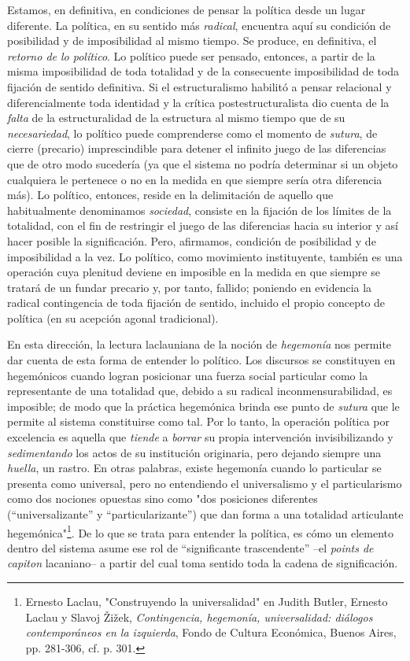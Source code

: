 \documentclass{book}
\begin{document}
Estamos, en definitiva, en condiciones de pensar la política desde un
lugar diferente. La política, en su sentido más \emph{radical},
encuentra aquí su condición de posibilidad y de imposibilidad al mismo
tiempo. Se produce, en definitiva, el \emph{retorno de lo político}. Lo
político puede ser pensado, entonces, a partir de la misma imposibilidad
de toda totalidad y de la consecuente imposibilidad de toda fijación de
sentido definitiva. Si el estructuralismo habilitó a pensar relacional y
diferencialmente toda identidad y la crítica postestructuralista dio
cuenta de la \emph{falta} de la estructuralidad de la estructura al
mismo tiempo que de su \emph{necesariedad}, lo político puede
comprenderse como el momento de \emph{sutura}, de cierre (precario)
imprescindible para detener el infinito juego de las diferencias que de
otro modo sucedería (ya que el sistema no podría determinar si un objeto
cualquiera le pertenece o no en la medida en que siempre sería otra
diferencia más). Lo político, entonces, reside en la delimitación de
aquello que habitualmente denominamos \emph{sociedad}, consiste en la
fijación de los límites de la totalidad, con el fin de restringir el
juego de las diferencias hacia su interior y así hacer posible la
significación. Pero, afirmamos, condición de posibilidad y de
imposibilidad a la vez. Lo político, como movimiento instituyente,
también es una operación cuya plenitud deviene en imposible en la medida
en que siempre se tratará de un fundar precario y, por tanto, fallido;
poniendo en evidencia la radical contingencia de toda fijación de
sentido, incluido el propio concepto de política (en su acepción agonal
tradicional).

En esta dirección, la lectura laclauniana de la noción de
\emph{hegemonía} nos permite dar cuenta de esta forma de entender lo
político. Los discursos se constituyen en hegemónicos cuando logran
posicionar una fuerza social particular como la representante de una
totalidad que, debido a su radical inconmensurabilidad, es imposible; de
modo que la práctica hegemónica brinda ese punto de \emph{sutura} que le
permite al sistema constituirse como tal. Por lo tanto, la operación
política por excelencia es aquella que \emph{tiende} a \emph{borrar} su
propia intervención invisibilizando y \emph{sedimentando} los actos de
su institución originaria, pero dejando siempre una \emph{huella}, un
rastro. En otras palabras, existe hegemonía cuando lo particular se
presenta como universal, pero no entendiendo el universalismo y el
particularismo como dos nociones opuestas sino como "dos posiciones
diferentes (``universalizante'' y ``particularizante'') que dan forma a
una totalidad articulante hegemónica"\footnote{Ernesto Laclau,
  "Construyendo la universalidad" en Judith Butler, Ernesto Laclau y
  Slavoj Žižek, \emph{Contingencia, hegemonía, universalidad: diálogos
  contemporáneos en la izquierda}, Fondo de Cultura Económica, Buenos
  Aires, pp. 281-306, cf. p. 301.}. De lo que se trata para entender la
política, es cómo un elemento dentro del sistema asume ese rol de
``significante trascendente'' --el \emph{points de capiton} lacaniano--
a partir del cual toma sentido toda la cadena de significación.
\end{document}
